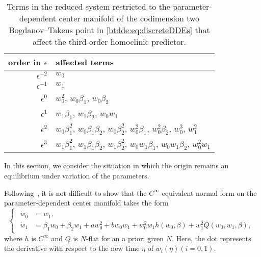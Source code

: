 \begin{table}
\begin{center}
\begingroup
\renewcommand*{\arraystretch}{1.4}
\begin{tabular}{rl}
\hline
order in $\epsilon$ & affected terms \\
\hline%
\(\epsilon^{-2}\) & $w_0$ \\
\(\epsilon^{-1}\) & $w_1$ \\
\(\epsilon^0\)    & $w_0^2$, $w_0 \beta_1$, $w_0 \beta_2$ \\
\(\epsilon^1\)    & $w_1\beta_1$, $w_1\beta_2$, $w_0w_1$ \\
\(\epsilon^2\)    & $w_0\beta_1^{2}$, $w_0\beta_1\beta_2$, $w_0\beta_2^{2}$, $w_0^{2}\beta_1$, $w_0^{2}\beta_2$, $w_0^{3}$, $w_1^{2}$ \\
\(\epsilon^3\)    & $w_1\beta_1^{2}$, $w_1\beta_1\beta_2$, $w_1\beta_2^{2}$, $w_0 w_1\beta_1$, $w_0w_1\beta_2$,  $w_0^{2}w_1$

\\[0.2cm]
\hline
\end{tabular}
\endgroup
\caption{
Terms in the reduced system restricted to the parameter-dependent center manifold of the
codimension two Bogdanov--Takens point in \cref{btdde:eq:discreteDDEs} that affect the third-order homoclinic predictor.} 
\label{btdde:table:terms_affecting_predicor}
\end{center}
\end{table}
%
In this section, we consider the situation in which the origin remains an equilibrium
under variation of the parameters.

Following~\cite{Broer1991}, it is not difficult to show that the $C^\infty$-equivalent normal form on the parameter-dependent
center manifold takes the form
\begin{equation}
\label{btdde:eq:normal_form_orbital_tbt}
\begin{cases}
\begin{aligned}
    \dot w_0 & =  w_1, \\
    \dot w_1 & =  \beta_1 w_0 + \beta_2 w_1 + aw_0^2 + b w_0 w_1 + w_0^2 w_1 h(w_0,\beta) + w_1^2 Q(w_0,w_1,\beta),
\end{aligned}
\end{cases}
\end{equation}
where $h$ is $C^\infty$ and $Q$ is $N$-flat for an a priori given $N$. Here,
the dot represents the derivative with respect to the new time $\eta$ of
$w_i(\eta)(i = 0,1)$. 


